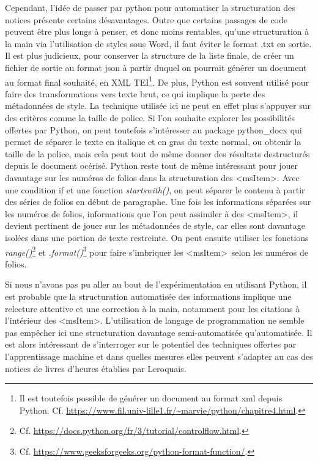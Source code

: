 \documentclass[a4paper,12pt,twoside]{book}
\begin{document}
Cependant, l'idée de passer par python pour automatiser la structuration des notices présente certains désavantages. Outre que certains passages de code peuvent être plus longs à penser, et donc moins rentables, qu'une structuration à la main via l'utilisation de styles sous Word, il faut éviter le format .txt en sortie. Il est plus judicieux, pour conserver la structure de la liste finale, de créer un fichier de sortie au format json à partir duquel on pourrait générer un document au format final souhaité, en XML TEI\footnote{Il est toutefois possible de générer un document au format xml depuis Python. Cf. \url{https://www.fil.univ-lille1.fr/~marvie/python/chapitre4.html}.}. De plus, Python est souvent utilisé pour faire des transformations vers texte brut, ce qui implique la perte des métadonnées de style. La technique utilisée ici ne peut en effet plus s'appuyer sur des critères comme la taille de police. Si l'on souhaite explorer les possibilités offertes par Python, on peut toutefois s'intéresser au package python\_docx qui permet de séparer le texte en italique et en gras du texte normal, ou obtenir la taille de la police, mais cela peut tout de même donner des résultats destructurés depuis le document océrisé. 
Python reste tout de même intéressant pour jouer davantage sur les numéros de folios dans la structuration des \textless msItem\textgreater . Avec une condition \og if\fg{} et une fonction \textit{startswith()}, on peut séparer le contenu à partir des séries de folios en début de paragraphe. Une fois les informations séparées sur les numéros de folios, informations que l'on peut assimiler à des \textless msItem\textgreater , il devient pertinent de jouer sur les métadonnées de style, car elles sont davantage isolées dans une portion de texte restreinte. On peut ensuite utiliser les fonctions \textit{range()}\footnote{Cf. \url{https://docs.python.org/fr/3/tutorial/controlflow.html}.} et \textit{.format()}\footnote{Cf. \url{https://www.geeksforgeeks.org/python-format-function/}.} pour faire s'imbriquer les \textless msItem\textgreater~selon les numéros de folios. 

Si nous n'avons pas pu aller au bout de l'expérimentation en utilisant Python, il est probable que la structuration automatisée des informations implique une relecture attentive et une correction à la main, notamment pour les citations à l'intérieur des \textless msItem\textgreater . L'utilisation de langage de programmation ne semble pas empêcher ici une structuration davantage semi-automatisée qu'automatisée. Il est alors intéressant de s'interroger sur le potentiel des techniques offertes par l'apprentissage machine et dans quelles mesures elles peuvent s'adapter au cas des notices de livres d'heures établies par Leroquais. 
	
\end{document}
